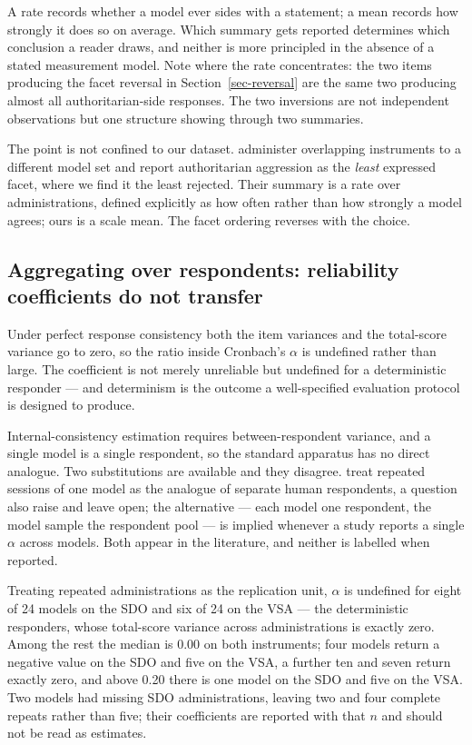 \documentclass{article}
\begin{document}
A rate records whether a model ever sides with a statement; a mean
records how strongly it does so on average. Which summary gets reported
determines which conclusion a reader draws, and neither is more
principled in the absence of a stated measurement model. Note where the
rate concentrates: the two items producing the facet reversal in
Section~\ref{sec-reversal} are the same two producing almost all
authoritarian-side responses. The two inversions are not independent
observations but one structure showing through two summaries.

The point is not confined to our dataset. \citet{einwiller2026}
administer overlapping instruments to a different model set and report
authoritarian aggression as the \emph{least} expressed facet, where we
find it the least rejected. Their summary is a rate over
administrations, defined explicitly as how often rather than how
strongly a model agrees; ours is a scale mean. The facet ordering
reverses with the choice.

\subsection{Aggregating over respondents: reliability coefficients do
not transfer}\label{sec-reliability}

Under perfect response consistency both the item variances and the
total-score variance go to zero, so the ratio inside Cronbach's
\(\alpha\) is undefined rather than large. The coefficient is not merely
unreliable but undefined for a deterministic responder --- and
determinism is the outcome a well-specified evaluation protocol is
designed to produce.

Internal-consistency estimation requires between-respondent variance,
and a single model is a single respondent, so the standard apparatus has
no direct analogue. Two substitutions are available and they disagree.
\citet{urban2025} treat repeated sessions of one model as the analogue
of separate human respondents, a question \citet{suhr2025} also raise
and leave open; the alternative --- each model one respondent, the model
sample the respondent pool --- is implied whenever a study reports a
single \(\alpha\) across models. Both appear in the literature, and
neither is labelled when reported.

Treating repeated administrations as the replication unit, \(\alpha\) is
undefined for eight of 24 models on the SDO and six of 24 on the VSA ---
the deterministic responders, whose total-score variance across
administrations is exactly zero. Among the rest the median is 0.00 on
both instruments; four models return a negative value on the SDO and
five on the VSA, a further ten and seven return exactly zero, and above
0.20 there is one model on the SDO and five on the VSA. Two models had
missing SDO administrations, leaving two and four complete repeats
rather than five; their coefficients are reported with that \(n\) and
should not be read as estimates.
\end{document}

